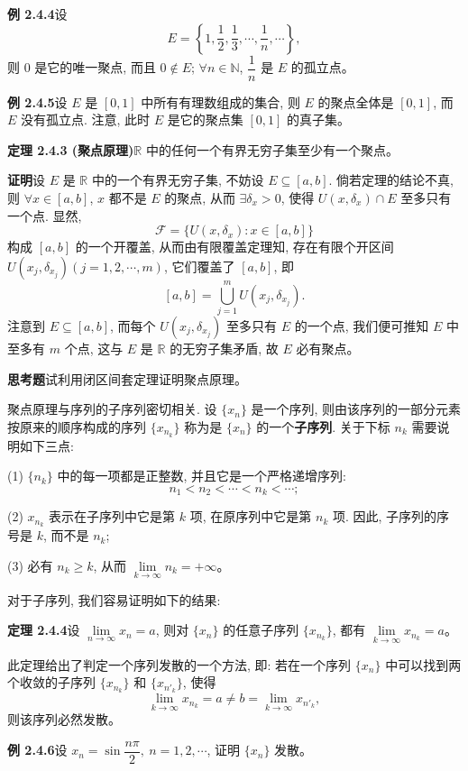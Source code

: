 \documentclass[UTF8,12pt,a4paper,fontset=fandol]{ctexart}
\begin{document}
\noindent\textbf{例 2.4.4}\quad 设
\[
  E=\left\{1,\frac12,\frac13,\cdots,\frac1n,\cdots\right\},
\]
则 $0$ 是它的唯一聚点, 而且 $0\notin E$; $\forall n\in\mathbb{N}$, $\dfrac1n$ 是 $E$ 的孤立点。

\noindent\textbf{例 2.4.5}\quad 设 $E$ 是 $[0,1]$ 中所有有理数组成的集合, 则 $E$ 的聚点全体是 $[0,1]$, 而 $E$ 没有孤立点. 注意, 此时 $E$ 是它的聚点集 $[0,1]$ 的真子集。

\noindent\textbf{定理 2.4.3 (聚点原理)}\quad $\mathbb{R}$ 中的任何一个有界无穷子集至少有一个聚点。

\noindent\textbf{证明}\quad 设 $E$ 是 $\mathbb{R}$ 中的一个有界无穷子集, 不妨设 $E\subseteq[a,b]$. 倘若定理的结论不真, 则 $\forall x\in[a,b]$, $x$ 都不是 $E$ 的聚点, 从而 $\exists\delta_x>0$, 使得 $U(x,\delta_x)\cap E$ 至多只有一个点. 显然,
\[
  \mathcal{F}=\{U(x,\delta_x):x\in[a,b]\}
\]
构成 $[a,b]$ 的一个开覆盖, 从而由有限覆盖定理知, 存在有限个开区间 $U(x_j,\delta_{x_j})(j=1,2,\cdots,m)$, 它们覆盖了 $[a,b]$, 即
\[
  [a,b]=\bigcup_{j=1}^m U(x_j,\delta_{x_j}).
\]
注意到 $E\subseteq[a,b]$, 而每个 $U(x_j,\delta_{x_j})$ 至多只有 $E$ 的一个点, 我们便可推知 $E$ 中至多有 $m$ 个点, 这与 $E$ 是 $\mathbb{R}$ 的无穷子集矛盾, 故 $E$ 必有聚点。

\noindent\textbf{思考题}\quad 试利用闭区间套定理证明聚点原理。

聚点原理与序列的子序列密切相关. 设 $\{x_n\}$ 是一个序列, 则由该序列的一部分元素按原来的顺序构成的序列 $\{x_{n_k}\}$ 称为是 $\{x_n\}$ 的一个\textbf{子序列}. 关于下标 $n_k$ 需要说明如下三点:

(1) $\{n_k\}$ 中的每一项都是正整数, 并且它是一个严格递增序列:
\[
  n_1<n_2<\cdots<n_k<\cdots;
\]

(2) $x_{n_k}$ 表示在子序列中它是第 $k$ 项, 在原序列中它是第 $n_k$ 项. 因此, 子序列的序号是 $k$, 而不是 $n_k$;

(3) 必有 $n_k\geqslant k$, 从而 $\lim\limits_{k\to\infty}n_k=+\infty$。

对于子序列, 我们容易证明如下的结果:

\noindent\textbf{定理 2.4.4}\quad 设 $\lim\limits_{n\to\infty}x_n=a$, 则对 $\{x_n\}$ 的任意子序列 $\{x_{n_k}\}$, 都有 $\lim\limits_{k\to\infty}x_{n_k}=a$。

此定理给出了判定一个序列发散的一个方法, 即: 若在一个序列 $\{x_n\}$ 中可以找到两个收敛的子序列 $\{x_{n_k}\}$ 和 $\{x_{n'_k}\}$, 使得
\[
  \lim_{k\to\infty}x_{n_k}=a\ne b=\lim_{k\to\infty}x_{n'_k},
\]
则该序列必然发散。

\noindent\textbf{例 2.4.6}\quad 设 $x_n=\sin\dfrac{n\pi}{2},\ n=1,2,\cdots$, 证明 $\{x_n\}$ 发散。
\end{document}
